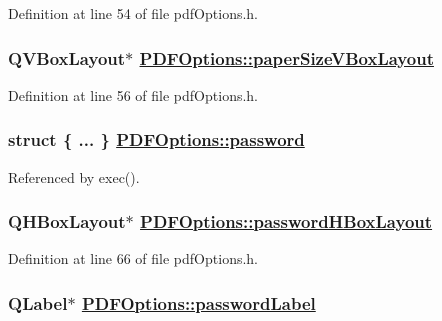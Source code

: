 Definition at line 54 of file pdf\-Options.h.\hypertarget{classPDFOptions_r18}{
\subsubsection[paperSizeVBoxLayout]{\setlength{\rightskip}{0pt plus 5cm}QVBox\-Layout$\ast$ \hyperlink{classPDFOptions_r18}{PDFOptions::paper\-Size\-VBox\-Layout}}}
\label{classPDFOptions_r18}


Definition at line 56 of file pdf\-Options.h.\hypertarget{classPDFOptions_r56}{
\subsubsection[password]{\setlength{\rightskip}{0pt plus 5cm}struct \{ ... \}   \hyperlink{classPDFOptions_r56}{PDFOptions::password}}}
\label{classPDFOptions_r56}




Referenced by exec().\hypertarget{classPDFOptions_r27}{
\subsubsection[passwordHBoxLayout]{\setlength{\rightskip}{0pt plus 5cm}QHBox\-Layout$\ast$ \hyperlink{classPDFOptions_r27}{PDFOptions::password\-HBox\-Layout}}}
\label{classPDFOptions_r27}


Definition at line 66 of file pdf\-Options.h.\hypertarget{classPDFOptions_r26}{
\subsubsection[passwordLabel]{\setlength{\rightskip}{0pt plus 5cm}QLabel$\ast$ \hyperlink{classPDFOptions_r26}{PDFOptions::password\-Label}}}
\label{classPDFOptions_r26}


